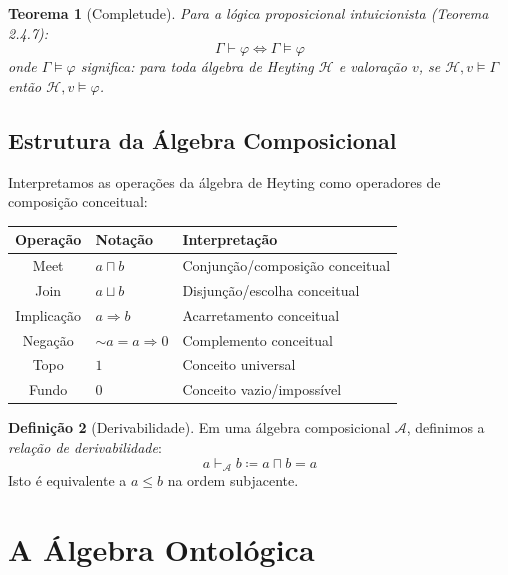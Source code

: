 \documentclass[12pt,a4paper]{article}
\theoremstyle{definition}
\newtheorem{definicao}{Definição}[section]
\theoremstyle{plain}
\newtheorem{teorema}[definicao]{Teorema}
\theoremstyle{remark}
\newcommand{\defeq}{\coloneqq}
\begin{document}
\begin{teorema}[Completude]
Para a lógica proposicional intuicionista (Teorema 2.4.7):
$$
\Gamma \vdash \varphi \iff \Gamma \models \varphi
$$
onde $\Gamma \models \varphi$ significa: para toda álgebra de Heyting $\mathcal{H}$ e valoração $v$, se $\mathcal{H}, v \models \Gamma$ então $\mathcal{H}, v \models \varphi$.
\end{teorema}

\subsection{Estrutura da Álgebra Composicional}

Interpretamos as operações da álgebra de Heyting como operadores de composição conceitual:

\begin{center}
\begin{tabular}{cll}
  \textbf{Operação} & \textbf{Notação} & \textbf{Interpretação} \\
  \midrule
  Meet & $a \sqcap b$ & Conjunção/composição conceitual \\
  Join & $a \sqcup b$ & Disjunção/escolha conceitual \\
  Implicação & $a \Rightarrow b$ & Acarretamento conceitual \\
  Negação & $\sim a = a \Rightarrow 0$ & Complemento conceitual \\
  Topo & $1$ & Conceito universal \\
  Fundo & $0$ & Conceito vazio/impossível \\
\end{tabular}
\end{center}

\begin{definicao}[Derivabilidade]
Em uma álgebra composicional $\mathcal{A}$, definimos a \emph{relação de derivabilidade}:
$$
a \vdash_{\mathcal{A}} b \defeq a \sqcap b = a
$$
Isto é equivalente a $a \leq b$ na ordem subjacente.
\end{definicao}

\section{A Álgebra Ontológica}
\end{document}
